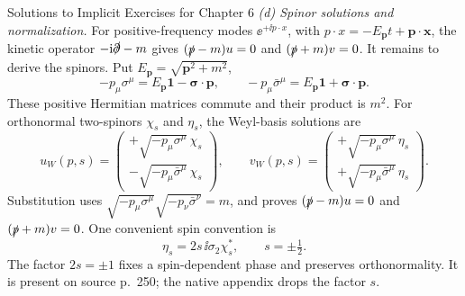 \begin{bankssolutions}{Solutions to Implicit Exercises for Chapter 6}
\textit{(d) Spinor solutions and normalization.}
For positive-frequency modes \(\ee^{+\ii p\cdot x}\), with
\(p\cdot x=-E_{\mathbf p}t+\mathbf p\cdot\mathbf x\), the kinetic operator
\(-\mathrm{i}\slashed\partial-m\) gives
\((\slashed p-m)u=0\) and \((\slashed p+m)v=0\).
It remains to derive the spinors.  Put \(E_{\mathbf p}=\sqrt{\mathbf p^2+m^2}\),
\begin{equation*}
 -p_\mu\sigma^\mu=E_{\mathbf p}\mathbf1-\boldsymbol\sigma\!\cdot\mathbf p,
 \qquad
 -p_\mu\bar\sigma^\mu=E_{\mathbf p}\mathbf1+\boldsymbol\sigma\!\cdot\mathbf p.
\end{equation*}
These positive Hermitian matrices commute and their product is \(m^2\).
For orthonormal two-spinors \(\chi_s\) and \(\eta_s\), the Weyl-basis
solutions are
\begin{equation*}
 u_W(p,s)=\begin{pmatrix}+\sqrt{-p_\mu\sigma^\mu}\,\chi_s\\
 -\sqrt{-p_\mu\bar\sigma^\mu}\,\chi_s\end{pmatrix},
 \qquad
 v_W(p,s)=\begin{pmatrix}+\sqrt{-p_\mu\sigma^\mu}\,\eta_s\\
 +\sqrt{-p_\mu\bar\sigma^\mu}\,\eta_s\end{pmatrix}.
\end{equation*}
Substitution uses
\(\sqrt{-p_\mu\sigma^\mu}\sqrt{-p_\nu\bar\sigma^\nu}=m\), and proves
\((\slashed p-m)u=0\) and \((\slashed p+m)v=0\).  One convenient spin
convention is
\begin{equation*}
 \eta_s=2s\,\ii\sigma_2\chi_s^*,\qquad s=\pm\tfrac12.
\end{equation*}
The factor \(2s=\pm1\) fixes a spin-dependent phase and preserves
orthonormality.  It is present on source p.~250; the native appendix drops
the factor \(s\).


\end{bankssolutions}
